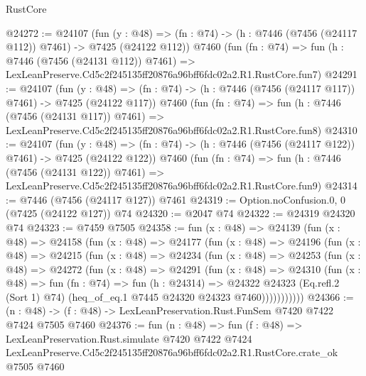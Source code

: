 \begin{lexlean}{RustCore}
\begin{coremodule}
@24272 := @24107
    (fun (y : @48) => (fn : @74) -> (h : @7446 (@7456 (@24117 @112)) @7461) -> @7425 (@24122 @112))
    @7460
    (fun (fn : @74) =>
    fun (h : @7446 (@7456 (@24131 @112)) @7461) =>
    LexLeanPreserve.Cd5c2f245135ff20876a96bff6fdc02a2.R1.RustCore.fun7)
@24291 := @24107
    (fun (y : @48) => (fn : @74) -> (h : @7446 (@7456 (@24117 @117)) @7461) -> @7425 (@24122 @117))
    @7460
    (fun (fn : @74) =>
    fun (h : @7446 (@7456 (@24131 @117)) @7461) =>
    LexLeanPreserve.Cd5c2f245135ff20876a96bff6fdc02a2.R1.RustCore.fun8)
@24310 := @24107
    (fun (y : @48) => (fn : @74) -> (h : @7446 (@7456 (@24117 @122)) @7461) -> @7425 (@24122 @122))
    @7460
    (fun (fn : @74) =>
    fun (h : @7446 (@7456 (@24131 @122)) @7461) =>
    LexLeanPreserve.Cd5c2f245135ff20876a96bff6fdc02a2.R1.RustCore.fun9)
@24314 := @7446 (@7456 (@24117 @127)) @7461
@24319 := Option.noConfusion.{0, 0} (@7425 (@24122 @127)) @74
@24320 := @2047 @74
@24322 := @24319 @24320 @74
@24323 := @7459 @7505
@24358 := fun (x : @48) =>
  @24139
    (fun (x : @48) =>
    @24158
      (fun (x : @48) =>
      @24177
        (fun (x : @48) =>
        @24196
          (fun (x : @48) =>
          @24215
            (fun (x : @48) =>
            @24234
              (fun (x : @48) =>
              @24253
                (fun (x : @48) =>
                @24272
                  (fun (x : @48) =>
                  @24291
                    (fun (x : @48) =>
                    @24310
                      (fun (x : @48) =>
                      fun (fn : @74) =>
                      fun (h : @24314) =>
                      @24322
                        @24323
                        (Eq.refl.{2} (Sort 1) @74)
                        (heq_of_eq.{1} @7445 @24320 @24323 @7460)))))))))))
@24366 := (n : @48) -> (f : @48) -> LexLeanPreservation.Rust.FunSem @7420 @7422 @7424 @7505 @7460
@24376 := fun (n : @48) =>
  fun (f : @48) =>
  LexLeanPreservation.Rust.simulate
    @7420
    @7422
    @7424
    LexLeanPreserve.Cd5c2f245135ff20876a96bff6fdc02a2.R1.RustCore.crate_ok
    @7505
    @7460
\end{coremodule}
\end{lexlean}
